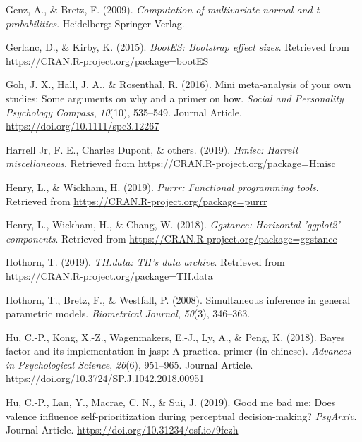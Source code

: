 \documentclass[man]{apa6}
\begin{document}
\leavevmode\hypertarget{ref-R-mvtnorm}{}%
Genz, A., \& Bretz, F. (2009). \emph{Computation of multivariate normal and t probabilities}. Heidelberg: Springer-Verlag.

\leavevmode\hypertarget{ref-R-bootES}{}%
Gerlanc, D., \& Kirby, K. (2015). \emph{BootES: Bootstrap effect sizes}. Retrieved from \url{https://CRAN.R-project.org/package=bootES}

\leavevmode\hypertarget{ref-Goh_2016_mini}{}%
Goh, J. X., Hall, J. A., \& Rosenthal, R. (2016). Mini meta-analysis of your own studies: Some arguments on why and a primer on how. \emph{Social and Personality Psychology Compass}, \emph{10}(10), 535--549. Journal Article. \url{https://doi.org/10.1111/spc3.12267}

\leavevmode\hypertarget{ref-R-Hmisc}{}%
Harrell Jr, F. E., Charles Dupont, \& others. (2019). \emph{Hmisc: Harrell miscellaneous}. Retrieved from \url{https://CRAN.R-project.org/package=Hmisc}

\leavevmode\hypertarget{ref-R-purrr}{}%
Henry, L., \& Wickham, H. (2019). \emph{Purrr: Functional programming tools}. Retrieved from \url{https://CRAN.R-project.org/package=purrr}

\leavevmode\hypertarget{ref-R-ggstance}{}%
Henry, L., Wickham, H., \& Chang, W. (2018). \emph{Ggstance: Horizontal 'ggplot2' components}. Retrieved from \url{https://CRAN.R-project.org/package=ggstance}

\leavevmode\hypertarget{ref-R-TH.data}{}%
Hothorn, T. (2019). \emph{TH.data: TH's data archive}. Retrieved from \url{https://CRAN.R-project.org/package=TH.data}

\leavevmode\hypertarget{ref-R-multcomp}{}%
Hothorn, T., Bretz, F., \& Westfall, P. (2008). Simultaneous inference in general parametric models. \emph{Biometrical Journal}, \emph{50}(3), 346--363.

\leavevmode\hypertarget{ref-Hu_2018_JASP}{}%
Hu, C.-P., Kong, X.-Z., Wagenmakers, E.-J., Ly, A., \& Peng, K. (2018). Bayes factor and its implementation in jasp: A practical primer (in chinese). \emph{Advances in Psychological Science}, \emph{26}(6), 951--965. Journal Article. \url{https://doi.org/10.3724/SP.J.1042.2018.00951}

\leavevmode\hypertarget{ref-Hu_2019_GoodSelf}{}%
Hu, C.-P., Lan, Y., Macrae, C. N., \& Sui, J. (2019). Good me bad me: Does valence influence self-prioritization during perceptual decision-making? \emph{PsyArxiv}. Journal Article. \url{https://doi.org/10.31234/osf.io/9fczh}
\end{document}
